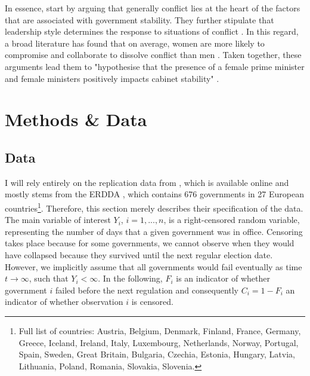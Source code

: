 \documentclass[11pt]{article}
\begin{document}
In essence, \textcite{KK20} start by arguing that generally conflict lies at the heart of the factors that are associated with government stability. They further stipulate that leadership style determines the response to situations of conflict \parencite{KK20}. In this regard, a broad literature has found that on average, women are more likely to compromise and collaborate to dissolve conflict than men \parencite[e.g.][]{KellermanRhode2017women}. Taken together, these arguments lead them to "hypothesise that the presence of a female prime minister and female ministers positively impacts cabinet stability" \parencite[4]{KK20}.


\section{Methods \& Data}
\subsection{Data}
I will rely entirely on the replication data from \textcite{KK20}, which is available online and mostly stems from the ERDDA \parencite{ERD2014}, which contains 676 governments in 27 European countries\footnote{Full list of countries: Austria, Belgium, Denmark, Finland, France, Germany, Greece, Iceland, Ireland, Italy, Luxembourg, Netherlands, Norway, Portugal, Spain, Sweden, Great Britain, Bulgaria, Czechia, Estonia, Hungary, Latvia, Lithuania, Poland, Romania, Slovakia, Slovenia.}. Therefore, this section merely describes their specification of the data. The main variable of interest $Y_i$, $i = 1, ..., n$, is a right-censored random variable, representing the number of days that a given government was in office. Censoring takes place because for some governments, we cannot observe when they would have collapsed because they survived until the next regular election date. However, we implicitly assume that all governments would fail eventually as time $t \to \infty$, such that $Y_i < \infty$. In the following, $F_i$ is an indicator of whether government $i$ failed before the next regulation and consequently $C_i = 1-F_i$ an indicator of whether observation $i$ is censored. 
\end{document}
